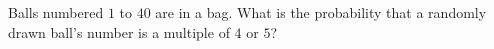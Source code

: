 Balls numbered $1$ to $40$ are in a bag. What is the probability that a randomly drawn ball's number is a multiple of $4$ or $5$?
